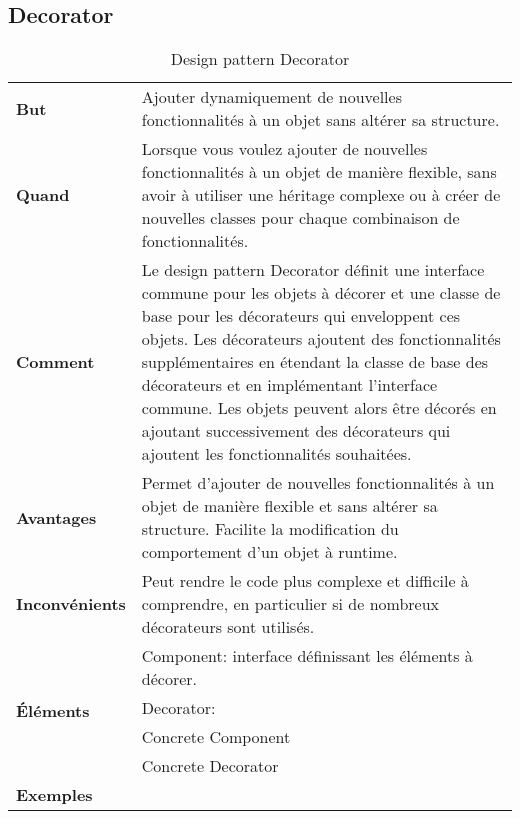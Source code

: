 \subsection{Decorator}
\begin{table}[H]
\caption{Design pattern Decorator}
\label{tbl:design_pattern_decorator}
\begin{adjustbox}{max width=\textwidth}
\begin{tabular}{l|p{\textwidth}}
\toprule
\textbf{But} & Ajouter dynamiquement de nouvelles fonctionnalités à un objet sans altérer sa structure.\\
\cmidrule(lr){1-2}
\textbf{Quand} & Lorsque vous voulez ajouter de nouvelles fonctionnalités à un objet de manière flexible, sans avoir à utiliser une héritage complexe ou à créer de nouvelles classes pour chaque combinaison de fonctionnalités.\\
\cmidrule(lr){1-2}
\textbf{Comment} & Le design pattern Decorator définit une interface commune pour les objets à décorer et une classe de base pour les décorateurs qui enveloppent ces objets. Les décorateurs ajoutent des fonctionnalités supplémentaires en étendant la classe de base des décorateurs et en implémentant l'interface commune. Les objets peuvent alors être décorés en ajoutant successivement des décorateurs qui ajoutent les fonctionnalités souhaitées.\\
\cmidrule(lr){1-2}
\textbf{Avantages} & Permet d'ajouter de nouvelles fonctionnalités à un objet de manière flexible et sans altérer sa structure. Facilite la modification du comportement d'un objet à runtime.\\
\cmidrule(lr){1-2}
\textbf{Inconvénients} & Peut rendre le code plus complexe et difficile à comprendre, en particulier si de nombreux décorateurs sont utilisés.\\
\cmidrule(lr){1-2}
\multirow{4}{*}{\textbf{\'El\'ements}} & Component: interface d\'efinissant les \'el\'ements \`a d\'ecorer.  \\
& Decorator:  \\
& Concrete Component \\
& Concrete Decorator \\
\cmidrule(lr){1-2}
\textbf{Exemples} & 
\hspace{4mm}
\begin{minipage}[tl]{0.5\textwidth}
\begin{minipage}[t]{1\textwidth}

\end{minipage}
\end{minipage}
\end{tabular}
\end{adjustbox}
\end{table}
